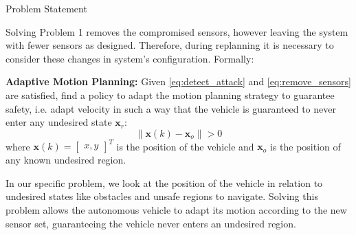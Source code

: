\begin{section}{Problem Statement}
\begin{problem}
\end{problem}
Solving Problem 1 removes the compromised sensors, however leaving the system with fewer sensors as designed. Therefore, during replanning it is necessary to consider these changes in system's configuration. Formally:
	
\begin{problem} \label{problem2} {\textbf{Adaptive Motion Planning:}}
Given \eqref{eq:detect_attack} and \eqref{eq:remove_sensors} are satisfied, find a policy to adapt the motion planning strategy to guarantee safety, i.e. adapt velocity in such a way that the vehicle is guaranteed to never enter any undesired state $\bm{x}_r$:
	\begin{equation}
		\lVert {\bm{x}(k)-\bm{x}_o} \rVert > 0
	\end{equation}
where $\bm{x}(k)={\begin{bmatrix} x,y \end{bmatrix}}^T$ is the position of the vehicle and $\bm{x}_o$ is the position of any known undesired region.
	\end{problem}

In our specific problem, we look at the position of the vehicle in relation to undesired states like obstacles and unsafe regions to navigate. Solving this problem allows the autonomous vehicle to adapt its motion according to the new sensor set, guaranteeing the vehicle never enters an undesired region.
\end{section}